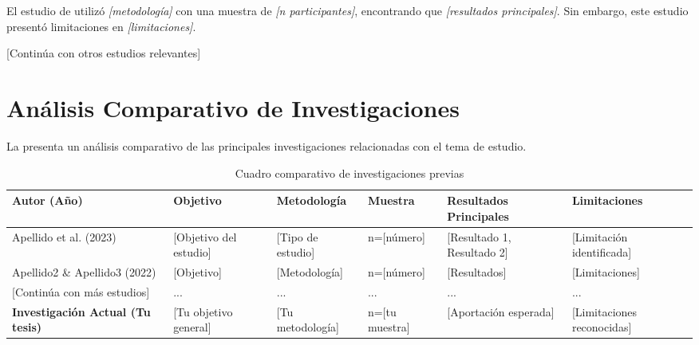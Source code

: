 El estudio de \cite{autor2023} utilizó \textit{[metodología]} con una muestra de \textit{[n participantes]}, encontrando que \textit{[resultados principales]}. Sin embargo, este estudio presentó limitaciones en \textit{[limitaciones]}.

[Continúa con otros estudios relevantes]

\section{Análisis Comparativo de Investigaciones}
\label{sec:cuadro_comparativo}


La  presenta un análisis comparativo de las principales investigaciones relacionadas con el tema de estudio.

\begin{table}[htbp]
    \centering
    \caption{Cuadro comparativo de investigaciones previas}
    \label{tab:comparativa_investigaciones}
    \small
    \begin{tabular}{@{}p{2cm}p{2.5cm}p{2cm}p{1.5cm}p{3cm}p{2cm}@{}}
        \toprule
        \textbf{Autor (Año)} & \textbf{Objetivo} & \textbf{Metodología} & \textbf{Muestra} & \textbf{Resultados Principales} & \textbf{Limitaciones} \\
        \midrule
        
        Apellido et al. (2023) & 
        [Objetivo del estudio] & 
        [Tipo de estudio] & 
        n=[número] & 
        [Resultado 1, Resultado 2] & 
        [Limitación identificada] \\
        
        \midrule
        
        Apellido2 \& Apellido3 (2022) & 
        [Objetivo] & 
        [Metodología] & 
        n=[número] & 
        [Resultados] & 
        [Limitaciones] \\
        
        \midrule
        
        [Continúa con más estudios] &
        ... &
        ... &
        ... &
        ... &
        ... \\
        
        \midrule
        
        \textbf{Investigación Actual (Tu tesis)} & 
        [Tu objetivo general] & 
        [Tu metodología] & 
        n=[tu muestra] & 
        [Aportación esperada] & 
        [Limitaciones reconocidas] \\
        
        \bottomrule
    \end{tabular}
\end{table}


